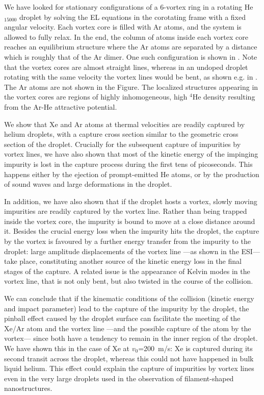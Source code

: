 We have looked for stationary configurations of a 6-vortex ring
in a rotating He$_{15000}$ droplet by solving the
EL equations in the corotating frame with a fixed
angular velocity. Each vortex core is filled with Ar
atoms, and the system is allowed to fully relax.
In the end, the column of atoms inside each vortex core reaches an equilibrium structure 
where the Ar atoms are separated by a distance which is roughly that of the Ar dimer.
One such configuration is shown in . Note that 
the vortex cores are almost straight lines, whereas in an
undoped droplet rotating with the same velocity 
the vortex lines would be bent, 
as shown e.g. in .
The Ar atoms are not shown in the Figure.
The localized structures appearing in the vortex cores are 
regions of highly inhomogeneous, high $^4$He density
resulting from the Ar-He attractive potential.
	
	
		We show that Xe and Ar atoms at thermal velocities are readily captured by helium droplets, with a capture cross section similar to the geometric cross section of the droplet. Crucially for the subsequent capture of impurities by vortex lines, we have also shown that most of the kinetic energy of the impinging impurity is lost in the capture process during the first tens of picoseconds. This happens either by the ejection of prompt-emitted He atoms, or by the production of sound waves and large deformations in the droplet. 

		In addition, we have also shown that if the droplet hosts a vortex, slowly moving impurities are readily captured by the vortex line. Rather than being trapped inside the vortex core, the impurity is bound to move at a close distance around it. Besides the crucial energy loss when the impurity hits the droplet, the capture by the vortex is favoured by a further energy transfer from the impurity to the droplet: large amplitude displacements of the vortex line ---as shown in the ESI\citep{ESI}--- take place, constituting another source of the kinetic energy loss in the final stages of the capture. A related issue is the appearance of Kelvin modes in the vortex line, that is not only bent, but also twisted in the course of the collision.

		We can conclude that if the kinematic conditions of the collision (kinetic energy and impact parameter) lead to the capture of the impurity by the droplet, the pinball effect caused by the droplet surface can facilitate the meeting of the Xe/Ar atom and the vortex line ---and the possible capture of the atom by the vortex--- since both have a tendency to remain in the inner region of the droplet. We have shown this in the case of Xe at $v_0$=200~m/s: Xe is captured during its second transit across the droplet, whereas this could not have happened in bulk liquid helium\citep{Psh16}. This effect could explain the capture of impurities by vortex lines even in the very large droplets used in the observation of filament-shaped nanostructures.

